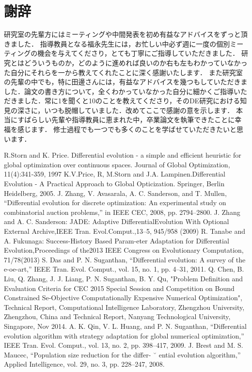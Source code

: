 \documentclass[a4paper,11pt,oneside,openany]{jsbook}
\begin{document}
\section{謝辞}
研究室の先輩方にはミーティングや中間発表を初め有益なアドバイスをずっと頂きました．
指導教員となる福永先生には，お忙しい中必ず週に一度の個別ミーティングの機会を与えてくださり，とても丁寧にご指導していただきました．
研究とはどういうものか，どのように進めれば良いのか右も左もわかっていなかった自分にそれらを一から教えてくれたことに深く感謝いたします．
また研究室の先輩の中でも，特に田邊さんには，有益なアドバイスを幾つもしていただきました．論文の書き方について，全くわかっていなかった自分に細かくご指導いただきました．常に1を聞くと10のことを教えてくださり，そのDE研究における知見の深さに，いつも脱帽していました．改めてここで感謝の意を示します．
本当にすばらしい先輩や指導教員に恵まれた中，卒業論文を執筆できたことに幸福を感じます．
修士過程でも一つでも多くのことを学ばせていただきたいと思います．
\begin{thebibliography}{10}
  R.Storn and K. Price. Differential evolution - a simple and efficient heuristic for global optimization over continuous spaces. Journal of Global Optimization, 11(4):341-359, 1997
  K.V.Price, R, M.Storn and J.A. Lampinen.Differential Evolution - A Practical Approach to Global Opticization. Springer, Berlin Heidelberg, 2005.
   J. Zhang, V. Avasarala, A. C. Sanderson, and T. Mullen, “Differential
evolution for discrete optimization: An experimental study on combinatorial
auction problems,” in IEEE CEC, 2008, pp. 2794–2800.
  J. Zhang and A. C. Sanderson: JADE: Adaptive DifferentialEvolution With Optional External Archive,IEEE Tran. Evol.Comput.,13–5, 945/958 (2009)
  R. Tanabe and A. Fukunaga: Success-History Based Param-eter Adaptation for Differential Evolution,Proceedings of the2013 IEEE Congress on Evolutionary Computation, 71/78(2013)
  S. Das and P. N. Suganthan, “Differential evolution: A survey of the
e-oe-art,” IEEE Tran. Evol. Comput., vol. 15, no. 1, pp. 4–31,
2011.
  Q. Chen, B. Liu,  Q. Zhang, J. J. Liang, P. N. Suganthan, B. Y. Qu, "Problem Definition and Evaluation Criteria for CEC 2015 Special Session and Competition on Bound Constrained Se-Objective Computationally Expensive Numerical Optimization", Technical Report, Computational Intelligence Laboratory, Zhengzhou University, Zhengzhou, China  and  Technical Report, Nanyang Technological University, Singapore, Nov 2014.
   A. K. Qin, V. L. Huang, and P. N. Suganthan, “Differential evolution
algorithm with strategy adaptation for global numerical optimization,”
IEEE Tran. Evol. Comput., vol. 13, no. 2, pp. 398–417, 2009.
  J. Brest and M. S. Maucec, “Population size reduction for the differ- ˘
ential evolution algorithm,” Applied Intelligence, vol. 29, no. 3, pp.
228–247, 2008.

\end{thebibliography}
\end{document}
